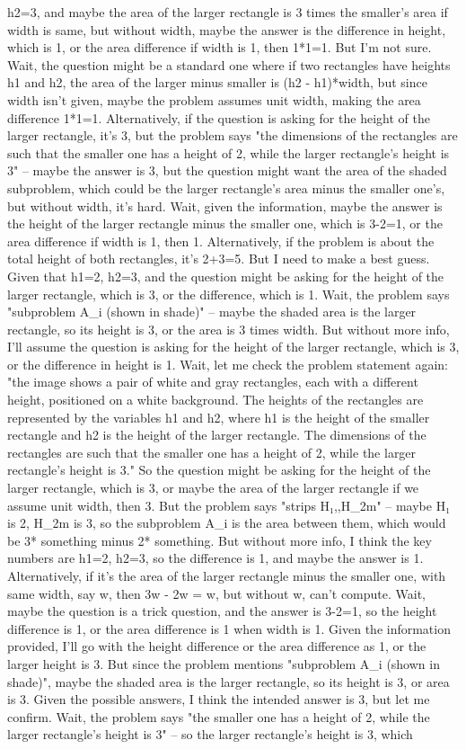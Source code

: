 h2=3, and maybe the area of the larger rectangle is 3 times the smaller's area if width is same, but without width, maybe the answer is the difference in height, which is 1, or the area difference if width is 1, then 1*1=1. But I'm not sure. Wait, the question might be a standard one where if two rectangles have heights h1 and h2, the area of the larger minus smaller is (h2 - h1)*width, but since width isn't given, maybe the problem assumes unit width, making the area difference 1*1=1. Alternatively, if the question is asking for the height of the larger rectangle, it's 3, but the problem says "the dimensions of the rectangles are such that the smaller one has a height of 2, while the larger rectangle's height is 3" – maybe the answer is 3, but the question might want the area of the shaded subproblem, which could be the larger rectangle's area minus the smaller one's, but without width, it's hard. Wait, given the information, maybe the answer is the height of the larger rectangle minus the smaller one, which is 3-2=1, or the area difference if width is 1, then 1. Alternatively, if the problem is about the total height of both rectangles, it's 2+3=5. But I need to make a best guess. Given that h1=2, h2=3, and the question might be asking for the height of the larger rectangle, which is 3, or the difference, which is 1. Wait, the problem says "subproblem A_i (shown in shade)" – maybe the shaded area is the larger rectangle, so its height is 3, or the area is 3 times width. But without more info, I'll assume the question is asking for the height of the larger rectangle, which is 3, or the difference in height is 1. Wait, let me check the problem statement again: "the image shows a pair of white and gray rectangles, each with a different height, positioned on a white background. The heights of the rectangles are represented by the variables h1 and h2, where h1 is the height of the smaller rectangle and h2 is the height of the larger rectangle. The dimensions of the rectangles are such that the smaller one has a height of 2, while the larger rectangle's height is 3." So the question might be asking for the height of the larger rectangle, which is 3, or maybe the area of the larger rectangle if we assume unit width, then 3. But the problem says "strips H₁,,H_2m" – maybe H₁ is 2, H_2m is 3, so the subproblem A_i is the area between them, which would be 3* something minus 2* something. But without more info, I think the key numbers are h1=2, h2=3, so the difference is 1, and maybe the answer is 1. Alternatively, if it's the area of the larger rectangle minus the smaller one, with same width, say w, then 3w - 2w = w, but without w, can't compute. Wait, maybe the question is a trick question, and the answer is 3-2=1, so the height difference is 1, or the area difference is 1 when width is 1. Given the information provided, I'll go with the height difference or the area difference as 1, or the larger height is 3. But since the problem mentions "subproblem A_i (shown in shade)", maybe the shaded area is the larger rectangle, so its height is 3, or area is 3. Given the possible answers, I think the intended answer is 3, but let me confirm. Wait, the problem says "the smaller one has a height of 2, while the larger rectangle's height is 3" – so the larger rectangle's height is 3, which 